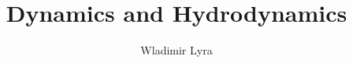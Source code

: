 \documentclass[a4paper,10pt]{book}
\begin{document}
\title{Dynamics and Hydrodynamics}
\author{Wladimir Lyra}
\date{}
\maketitle


\frontmatter
\tableofcontents

\mainmatter







\appendix




%
%
%
%
%
%
%
%
%
%

%

\backmatter



\end{document}
